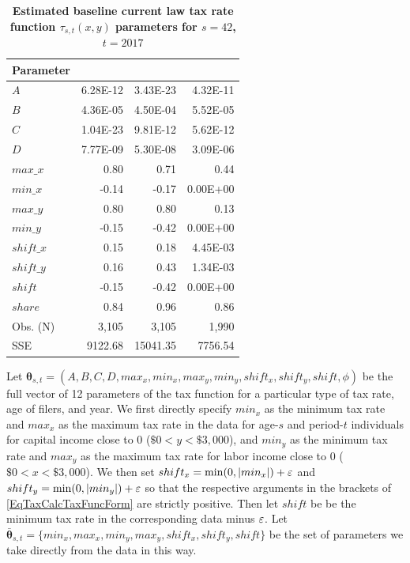   \begin{table}[htbp] \centering \captionsetup{width=3.0in}
  \caption{\label{TabTaxCalcEst42}\textbf{Estimated baseline current law tax rate function $\tau_{s,t}(x,y)$ parameters for $s=42$, $t=2017$}}
    \begin{threeparttable}
    \begin{tabular}{>{\footnotesize}l |>{\footnotesize}r >{\footnotesize}r >{\footnotesize}r}
    \hline\hline
    Parameter & \multicolumn{1}{c}{\footnotesize{$ETR$}} & \multicolumn{1}{c}{\footnotesize{$MTRx$}} & \multicolumn{1}{c}{\footnotesize{$MTRy$}} \\
    \hline
    $A$ & 6.28E-12 & 3.43E-23 & 4.32E-11 \\
    $B$ & 4.36E-05 & 4.50E-04 & 5.52E-05 \\
    $C$ & 1.04E-23 & 9.81E-12 & 5.62E-12 \\
    $D$ & 7.77E-09 & 5.30E-08 & 3.09E-06 \\
    $max\_{x}$ & 0.80  & 0.71  & 0.44  \\
    $min\_{x}$ & -0.14 & -0.17 & 0.00E+00 \\
    $max\_{y}$ & 0.80  & 0.80  & 0.13 \\
    $min\_{y}$ & -0.15 & -0.42 & 0.00E+00 \\
    $shift\_{x}$ & 0.15  & 0.18  & 4.45E-03 \\
    $shift\_{y}$ & 0.16  & 0.43  & 1.34E-03 \\
    $shift$ & -0.15 & -0.42 & 0.00E+00 \\
    $share$ & 0.84  & 0.96  & 0.86 \\
    \hline
    Obs. (N) & 3,105 & 3,105 & 1,990 \\
    SSE   & 9122.68 & 15041.35 & 7756.54 \\
    \hline\hline
    \end{tabular}
    \end{threeparttable}
  \end{table}

  Let $\bm{\theta}_{s,t}=(A,B,C,D,max_x,min_x,max_y,min_y,shift_x,shift_y,shift,\phi)$ be the full vector of 12 parameters of the tax function for a particular type of tax rate, age of filers, and year. We first directly specify $min_x$ as the minimum tax rate and $max_x$ as the maximum tax rate in the data for age-$s$ and period-$t$ individuals for capital income close to 0 ($\$0<y<\$3,000$), and $min_y$ as the minimum tax rate and $max_y$ as the maximum tax rate for labor income close to 0 ($\$0<x<\$3,000$). We then set $shift_x = \min(0,|min_x|)+\varepsilon$ and $shift_y = \min(0,|min_y|)+\varepsilon$ so that the respective arguments in the brackets of \eqref{EqTaxCalcTaxFuncForm} are strictly positive. Then let $shift$ be be the minimum tax rate in the corresponding data minus $\varepsilon$. Let $\bar{\bm{\theta}}_{s,t}=\{min_x,max_x,min_y,max_y,shift_x,shift_y, shift\}$ be the set of parameters we take directly from the data in this way.

